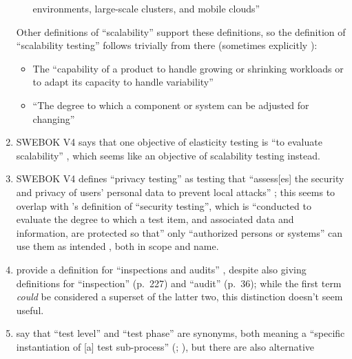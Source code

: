 \begin{enumerate}
\begin{enumerate}
                        environments, large-scale clusters, and mobile clouds''
                        \citep[p.~5-5]{SWEBOK2024}
            \end{enumerate}
            Other definitions of ``scalability'' support these definitions, so
            the definition of ``scalability testing'' follows trivially from there
            (sometimes explicitly \citepISTQB{}):
            \begin{itemize}
                  \item The ``capability of a product to handle growing or
                        shrinking workloads or to adapt its capacity to handle
                        variability'' \citep{ISO_IEC2023a}
                  \item ``The degree to which a component or system can be
                        adjusted for changing'' \citepISTQB{}
            \end{itemize}
      \item SWEBOK V4 says that one objective of elasticity testing is ``to
            evaluate scalability'' \citep[p.~5-9]{SWEBOK2024}, which seems like
            an objective of scalability testing instead.
      \item SWEBOK V4 defines ``privacy testing'' as testing that ``assess[es]
            the security and privacy of users' personal data to prevent local
            attacks'' \citep[p.~5-10]{SWEBOK2024}; this seems to overlap with
            \citeauthor{IEEE2022}'s definition of ``security testing'', which is
            ``conducted to evaluate the degree to which a test item, and
            associated data and information, are protected so that'' only
            ``authorized persons or systems'' can use them as intended
            \citeyearpar[p.~9]{IEEE2022}, both in scope and name.
      \item \citeauthor*{IEEE2017} provide a definition for ``inspections and
            audits'' \citeyearpar[p.~228]{IEEE2017}, despite also giving
            definitions for ``inspection'' (p.~227) and ``audit'' (p.~36);
            while the first term \emph{could} be considered a superset of the
            latter two, this distinction doesn't seem useful.
      \item \citeauthor*{IEEE2017} say that ``test level'' and ``test phase''
            are synonyms, both meaning a ``specific instantiation of [a] test
            sub-process'' (\citeyear[pp.~469,~470]{IEEE2017};
            \citeyear[p.~9]{IEEE2013}), but there are also alternative

\end{enumerate}
